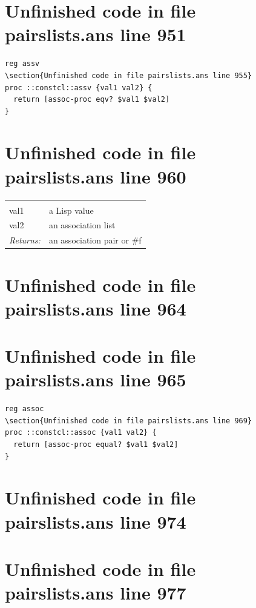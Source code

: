 \documentclass[twoside,9pt]{report}
\begin{document}
\section{Unfinished code in file pairslists.ans line 951}
\begin{lstlisting}
reg assv
\section{Unfinished code in file pairslists.ans line 955}
proc ::constcl::assv {val1 val2} {
  return [assoc-proc eqv? $val1 $val2]
}
\end{lstlisting}
\section{Unfinished code in file pairslists.ans line 960}
\noindent\begin{tabular}{ |p{1.9cm} p{8cm}| }
\hline
\rowcolor[HTML]{CCCCCC} \multicolumn{2}{|l|}{\bf assoc (public)} \\
val1 & a Lisp value \\
val2 & an association list \\
\textit{Returns:} & an association pair or \#f \\
\hline
\end{tabular}
\section{Unfinished code in file pairslists.ans line 964}
\section{Unfinished code in file pairslists.ans line 965}
\begin{lstlisting}
reg assoc
\section{Unfinished code in file pairslists.ans line 969}
proc ::constcl::assoc {val1 val2} {
  return [assoc-proc equal? $val1 $val2]
}
\end{lstlisting}
\section{Unfinished code in file pairslists.ans line 974}

\section{Unfinished code in file pairslists.ans line 977}
\end{document}
